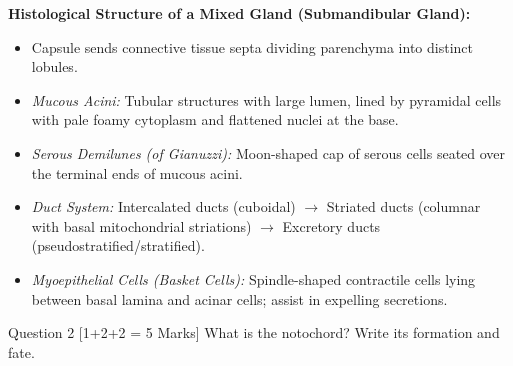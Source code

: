 \documentclass[11pt,a4paper]{article}
\begin{document}
\begin{ansbox}
\textbf{Histological Structure of a Mixed Gland (Submandibular Gland):}
\begin{itemize}[leftmargin=*]
    \item Capsule sends connective tissue septa dividing parenchyma into distinct lobules.
    \item \textit{Mucous Acini:} Tubular structures with large lumen, lined by pyramidal cells with pale foamy cytoplasm and flattened nuclei at the base.
    \item \textit{Serous Demilunes (of Gianuzzi):} Moon-shaped cap of serous cells seated over the terminal ends of mucous acini.
    \item \textit{Duct System:} Intercalated ducts (cuboidal) $\rightarrow$ Striated ducts (columnar with basal mitochondrial striations) $\rightarrow$ Excretory ducts (pseudostratified/stratified).
    \item \textit{Myoepithelial Cells (Basket Cells):} Spindle-shaped contractile cells lying between basal lamina and acinar cells; assist in expelling secretions.
\end{itemize}
\end{ansbox}

\begin{qbox}{Question 2 [1+2+2 = 5 Marks]}
What is the notochord? Write its formation and fate.
\end{qbox}
\end{document}
